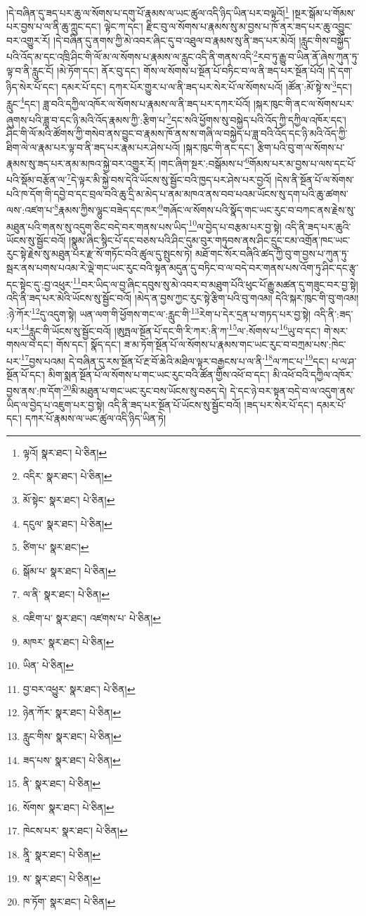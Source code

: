 །དེ་བཞིན་དུ་ཟད་པར་ཆུ་ལ་སོགས་པ་དགུ་པོ་རྣམས་ལ་ཡང་ཚུལ་འདི་ཉིད་ཡིན་པར་བལྟའོ།\footnote{ལྟའོ།  སྣར་ཐང་།  པེ་ཅིན། } །སྔར་སྒོམ་པ་གོམས་པར་བྱས་པ་ལ་ནི་ཆུ་ཀླུང་དང་། ལྟེང་ཀ་དང་། རྫིང་བུ་ལ་སོགས་པ་རྣམས་སུ་མ་བྱས་པ་ཁོ་ནར་ཟད་པར་ཆུ་འབྱུང་བར་འགྱུར་རོ། །དེ་བཞིན་དུ་ནགས་ཀྱི་མེ་འབར་ཞིང་དུ་བ་འཐུལ་བ་རྣམས་སུ་ནི་ཟད་པར་མེའོ། །རླུང་གིས་བསྐྱོད་པའི་འོད་མ་དང་འཁྲི་ཤིང་གི་ལོ་མ་ལ་སོགས་པ་རྣམས་ལ་རླུང་འདི་ནི་གནས་འདི་\footnote{འདིར་  སྣར་ཐང་།  པེ་ཅིན། }རབ་ཏུ་རྒྱུ་བ་ཡིན་ནོ་ཞེས་ཀུན་ཏུ་ལྟ་བ་ནི་རླུང་ངོ། །མེ་ཏོག་དང་། ནོར་བུ་དང་། གོས་ལ་སོགས་པ་སྔོན་པོ་བཏིང་བ་ལ་ནི་ཟད་པར་སྔོན་པོའོ། །དེ་དག་ཉིད་སེར་པོ་དང་། དམར་པོ་དང་། དཀར་པོར་གྱུར་པ་ལ་ནི་ཟད་པར་སེར་པོ་ལ་སོགས་པའོ། །ཚོན་:མོ་སྟེ་ས་\footnote{མོ་སྟེང་  སྣར་ཐང་།  པེ་ཅིན། }དང་། རླུང་\footnote{དངུལ་  སྣར་ཐང་།  པེ་ཅིན། }དང་། ཟླ་བའི་དཀྱིལ་འཁོར་ལ་སོགས་པ་རྣམས་ལ་ནི་ཟད་པར་དཀར་པོའོ། །སྐར་ཁུང་གི་ནང་ལ་སོགས་པར་ཞུགས་པའི་ཟླ་བ་དང་ཉི་མའི་འོད་རྣམས་ཀྱི་:རྩིག་པ་\footnote{ཙིག་པ་  སྣར་ཐང་། }དང་སའི་ཕྱོགས་སུ་བསྐྱེད་པའི་འོད་ཀྱི་དཀྱིལ་འཁོར་དང་། ཤིང་གི་ལོ་མའི་ཚོགས་ཀྱི་གསེབ་ནས་བྱུང་བ་རྣམས་ཁོ་ནས་ས་གཞི་ལ་བསྐྱེད་པ་ཟླ་བའི་འོད་དང་ཉི་མའི་འོད་ཀྱི་ཐིག་ལེ་ལ་རྣམ་པར་ལྟ་བ་ནི་ཟད་པར་རྣམ་པར་ཤེས་པའོ། །སྐར་ཁུང་གི་ནང་དང་། རྩིག་པའི་བུ་ག་ལ་སོགས་པ་རྣམས་སུ་ཟད་པར་ནམ་མཁའ་སྐྱེ་བར་འགྱུར་རོ། །གང་ཞིག་སྔར་:བསྒོམས་པ་\footnote{སྒོམ་པ་  སྣར་ཐང་།  པེ་ཅིན། }གོམས་པར་མ་བྱས་པ་ལས་དང་པོ་པའི་སྡོམ་བརྩོན་ལ་\footnote{ལ་ནི་  སྣར་ཐང་།  པེ་ཅིན། }དེ་ལྟར་མི་སྐྱེ་བས་དེའི་ཡོངས་སུ་སྦྱོང་བའི་ཁྱད་པར་ཤེས་པར་བྱའོ། །དེས་ནི་སྔོན་པོ་ལ་སོགས་པའི་ཁ་དོག་གི་དབྱེ་བ་དང་བྲལ་བའི་ཆུ་དྲི་མ་མེད་པ་ནམ་མཁའ་ནས་བབ་པའམ་ཡོངས་སུ་དག་པའི་ཆུ་ཚགས་ལས་:འཛག་པ་\footnote{འཇིག་པ་  སྣར་ཐང་། འཛགས་པ་  པེ་ཅིན། }རྣམས་ཀྱིས་ལྷུང་བཟེད་དང་ཁར་\footnote{མཁར་  སྣར་ཐང་།  པེ་ཅིན། }གཞོང་ལ་སོགས་པའི་སྣོད་གང་ཡང་རུང་བ་བཀང་ནས་རྗེས་སུ་མཐུན་པའི་གནས་སུ་འདུག་ཅིང་བདེ་བར་གནས་པས་ཡིད་\footnote{ཡིན་  པེ་ཅིན། }ལ་བྱེད་པ་བརྩམ་པར་བྱ་སྟེ། འདི་ནི་ཟད་པར་ཆུའི་ཡོངས་སུ་སྦྱོང་བའོ། །སྣུམ་ཞིང་སྙིང་པོ་དང་བཅས་པའི་ཤིང་དུམ་བུར་གཏུབས་ནས་ཤིང་དྲུང་ངམ་འགྲོན་ཁང་ཡང་རུང་སྟེ་རྗེས་སུ་མཐུན་པར་རྫ་སོ་གཏོང་བའི་ཚུལ་དུ་སྤུངས་ཏེ། མཐོ་གང་སོར་བཞིའི་ཚད་ཀྱི་བུ་ག་བྱས་པ་ཀུན་ཏུ་སྦར་ནས་པགས་པའམ་རེ་ལྡེ་གང་ཡང་རུང་བའི་སྟན་མདུན་དུ་བཏིང་བ་ལ་བདེ་བར་གནས་པས་འོག་ཏུ་ཤིང་དང་རྩྭ་དང་སྟེང་དུ་:བྱ་འཕུར་\footnote{བྱ་བར་འཕྱུར་  སྣར་ཐང་།  པེ་ཅིན། }བར་ཡིད་ལ་བྱ་ཞིང་དབུས་སུ་མེ་འབར་བ་མཐུག་པོའི་ཕུང་པོ་རྒྱུ་མཚན་དུ་གཟུང་བར་བྱ་སྟེ། འདི་ནི་ཟད་པར་མེའི་ཡོངས་སུ་སྦྱོང་བའོ། །མེད་ན་བྱས་ཀྱང་རུང་སྟེ་རྩིག་པའི་བུ་གའམ། དེའི་སྐར་ཁུང་གི་བུ་གའམ། :ཉེ་ཀོར་\footnote{ཉེན་ཀོར་  སྣར་ཐང་།  པེ་ཅིན། }དུ་འདུག་སྟེ། ཡན་ལག་གི་ཕྱོགས་གང་ལ་:རླུང་གི་\footnote{རླུང་གིས་  སྣར་ཐང་།  པེ་ཅིན། }རེག་པ་དེར་དྲན་པ་གཏད་པར་བྱ་སྟེ། འདི་ནི་:ཟད་པར་\footnote{ཟད་པས་  སྣར་ཐང་།  པེ་ཅིན། }རླུང་གི་ཡོངས་སུ་སྦྱོང་བའོ། །ཨུཏྤལ་སྔོན་པོ་དང་གི་རི་ཀར་:ནི་ཀ་\footnote{ནི་  སྣར་ཐང་།  པེ་ཅིན། }ལ་:སོགས་པ་\footnote{སོགས་  སྣར་ཐང་།  པེ་ཅིན། }ཡུ་བ་དང་། གེ་སར་གསལ་བ་དང་། གོས་དང་། སྣོད་དང་། ཟ་མ་ཏོག་སྔོན་པོ་ལ་སོགས་པ་རྣམས་གང་ཡང་རུང་བ་བཀྲམ་པས་:ཁེང་པར་\footnote{ཁེངས་པར་  སྣར་ཐང་།  པེ་ཅིན། }བྱས་པའམ། དེ་བཞིན་དུ་རས་སྔོན་པོ་རྔ་བོ་ཆེའི་མཐིལ་ལྟར་བརྒྱངས་པ་ལ་ནི་\footnote{ནཱི་  སྣར་ཐང་།  པེ་ཅིན། }ལ་ཀང་པ་\footnote{ས་  སྣར་ཐང་།  པེ་ཅིན། }དང་། པ་ལ་ཤ་སྔོན་པོ་དང་། མིག་སྨན་སྔོན་པོ་ལ་སོགས་པ་གང་ཡང་རུང་བའི་ཚོན་གྱིས་འཕོ་བ་དང་། མི་འཕོ་བའི་དཀྱིལ་འཁོར་བྱས་ནས་:ཁ་དོག་\footnote{ཁ་ཏོག་  སྣར་ཐང་།  པེ་ཅིན། }མི་མཐུན་པ་གང་ཡང་རུང་བས་ཡོངས་སུ་བཅད་དེ། དེ་དང་ཉེ་བར་སྟན་བདེ་བ་ལ་འདུག་ནས་ཡིད་ལ་བྱེད་པ་འཇུག་པར་བྱ་སྟེ། འདི་ནི་ཟད་པར་སྔོན་པོ་ཡོངས་སུ་སྦྱོང་བའོ། །ཟད་པར་སེར་པོ་དང་། དམར་པོ་དང་། དཀར་པོ་རྣམས་ལ་ཡང་ཚུལ་འདི་ཉིད་ཡིན་ཏེ། 